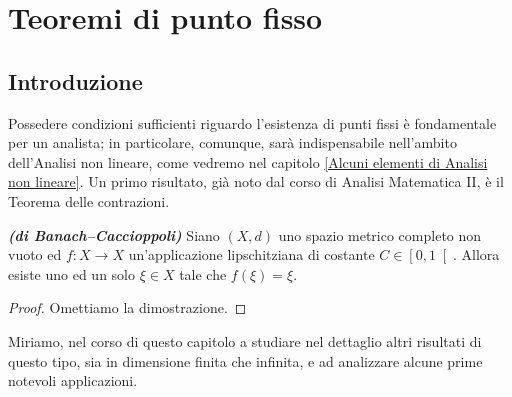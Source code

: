 

\chapter{Teoremi di punto fisso}\label{Teoremi di punto fisso}
\section{Introduzione}
Possedere condizioni sufficienti riguardo l'esistenza di punti fissi è fondamentale per un analista; in particolare, comunque, sarà indispensabile nell'ambito dell'Analisi non lineare, come vedremo nel capitolo \ref{Alcuni elementi di Analisi non lineare}. Un primo risultato, già noto dal corso di Analisi Matematica II, è il Teorema delle contrazioni.

\begin{teorema}\emph{\textbf{(di Banach--Caccioppoli)}}
	Siano $(X,d)$ uno spazio metrico completo non vuoto ed $f: X \to X$ un'applicazione lipschitziana di costante $C \in \left[ 0,1\right[ $. Allora esiste uno ed un solo $\xi \in X$ tale che $f(\xi) = \xi$.
\end{teorema}
\begin{proof}
	Omettiamo la dimostrazione.
\end{proof}
Miriamo, nel corso di questo capitolo a studiare nel dettaglio altri risultati di questo tipo, sia in dimensione finita che infinita, e ad analizzare alcune prime notevoli applicazioni.
